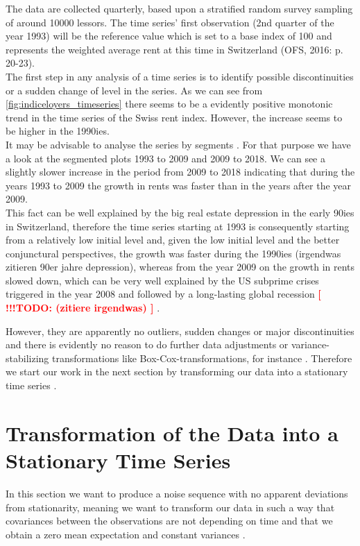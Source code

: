\documentclass[11pt,a4paper]{article}
\newcommand{\TODO}[1]{%
    \textcolor{red}{ %
        \textbf{[ !!!TODO: #1 ]}%
    }%
    \PackageWarning{TODO:}{TODO: #1}%
}
\begin{document}
The data are collected quarterly, based upon a stratified random survey sampling of around \num{10000} lessors.
The time series' first observation (2nd quarter of the year 1993) will be the reference value which is set to a base index of 100 and represents the weighted average rent at this time in Switzerland (OFS, 2016: p. 20-23).\\
The first step in any analysis of a time series is to identify possible discontinuities or a sudden change of level in the series\cite[p.~23]{bd02}.
As we can see from \cref{fig:indiceloyers_timeseries} there seems to be a evidently positive monotonic trend in the time series of the Swiss rent index.
However, the increase seems to be higher in the 1990ies.\\
It may be advisable to analyse the series by  segments \cite[p.~23]{bd02}.
For that purpose we have a look at the segmented plots 1993 to 2009 and 2009 to 2018.
We can see a slightly slower increase in the period from 2009 to 2018 indicating that during the years 1993 to 2009 the growth in rents was faster than in the years after the year 2009.\\
This fact can be well explained by the big real estate depression in the early 90ies in Switzerland, therefore the time series starting at 1993 is consequently starting from a relatively low initial level and, given the low initial level and the better conjunctural perspectives, the growth  was faster during the 1990ies (irgendwas zitieren 90er jahre depression), whereas from the year 2009 on the growth in rents slowed down, which can be very well explained by the US subprime crises triggered in the year 2008 and followed by a long-lasting global recession \TODO{(zitiere irgendwas)}.

However, they are apparently no outliers, sudden changes or major discontinuities and there is evidently no reason to do further data adjustments or variance-stabilizing transformations like Box-Cox-transformations, for instance \citep{boxcox64}.
Therefore we start our work in the next section by transforming our data into a stationary time series \cite[p.~45--82]{bd02}.



\section{Transformation of the Data into a Stationary Time Series}

In this section we want to produce a noise sequence with no apparent deviations from stationarity, meaning we want to transform our data in such a way that covariances between the observations are not depending on time and that we obtain a zero mean expectation and constant variances \cite[pp.~14--23]{bd02}.
\end{document}
